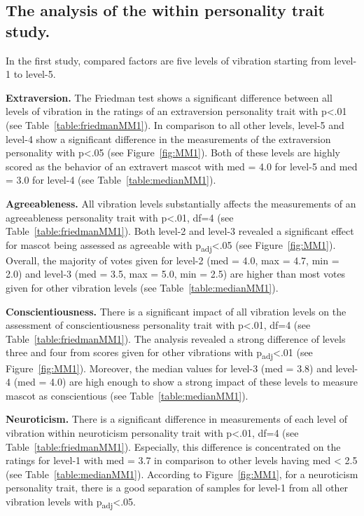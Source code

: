 \subsection{The analysis of the within personality trait study.}
\label{subsec:MMstudy1}
In the first study, compared factors are five levels of vibration starting from level-1 to level-5.

\par\textbf{Extraversion.}
The Friedman test shows a significant difference between all levels of vibration in the
ratings of an extraversion personality trait with p<.01 (see Table~\ref{table:friedmanMM1}).
In comparison to all other levels, level-5 and level-4 show a significant difference
in the measurements of the extraversion personality with p<.05 (see Figure~\ref{fig:MM1}).
Both of these levels are highly scored as the behavior of an extravert mascot
with med = 4.0 for level-5 and med = 3.0 for level-4 (see Table~\ref{table:medianMM1}).

\par\textbf{Agreeableness.}
All vibration levels substantially affects the measurements of an agreeableness personality
trait with p<.01, df=4 (see Table~\ref{table:friedmanMM1}).
Both level-2 and level-3 revealed a significant effect for mascot being
assessed as agreeable with p\textsubscript{adj}<.05 (see Figure~\ref{fig:MM1}).
Overall, the majority of votes given for level-2 (med = 4.0, max = 4.7, min = 2.0) and level-3
(med = 3.5, max = 5.0, min = 2.5) are higher than most
votes given for other vibration levels (see Table~\ref{table:medianMM1}).

\par\textbf{Conscientiousness.}
There is a significant impact of all vibration levels on the assessment of conscientiousness
personality trait with p<.01, df=4 (see Table~\ref{table:friedmanMM1}).
The analysis revealed a strong difference of levels three and four
from scores given for other vibrations with p\textsubscript{adj}<.01 (see Figure~\ref{fig:MM1}).
Moreover, the median values for level-3 (med = 3.8) and level-4 (med = 4.0) are high enough
to show a strong impact of these levels to measure mascot as conscientious (see Table~\ref{table:medianMM1}).

\par\textbf{Neuroticism.}
There is a significant difference in measurements of each level of vibration within neuroticism
personality trait with p<.01, df=4 (see Table~\ref{table:friedmanMM1}).
Especially, this difference is concentrated on the ratings for level-1 with med = 3.7
in comparison to other levels having med < 2.5 (see Table~\ref{table:medianMM1}).
According to Figure~\ref{fig:MM1}, for a neuroticism personality trait, there is a good separation of samples for level-1
from all other vibration levels with p\textsubscript{adj}<.05.


